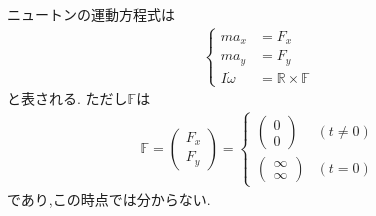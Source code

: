 \documentclass[a4paper,11pt]{jsarticle}
\begin{document}
ニュートンの運動方程式は
\begin{gather*}
  \begin{cases}
    m a_x &= F_x
    \\
    m a_y &= F_y
    \\
    I\dot{\omega} &= \mathbb{R} \times \mathbb{F}
  \end{cases}
\end{gather*}
と表される.
ただし$\mathbb{F}$は
\begin{gather*}
  \mathbb{F} = \begin{pmatrix}
    F_x
    \\
    F_y
  \end{pmatrix}
  = \begin{cases}
    \begin{pmatrix}
      0
      \\
      0
    \end{pmatrix} & (t\neq 0)
    \\
    \begin{pmatrix}
      \infty
      \\
      \infty
    \end{pmatrix} & (t = 0)
  \end{cases}
\end{gather*}
であり,この時点では分からない.
\end{document}
